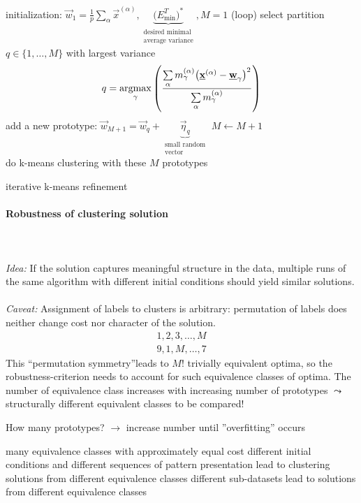 \begin{algorithm}
\DontPrintSemicolon
initialization: $\vec{w}_1 = \frac{1}{p} \sum\limits_{\alpha} 
	\vec{x}^{(\alpha)}, \underbrace{ \big( E_{\min}^T \big)^* }_{
			\substack{	\text{desired minimal} \\
					\text{average variance}} }
		, M = 1$ \;
\Begin(loop){
 \;
select partition $q \in \{ 1, \ldots, M \}$ with largest variance
\[ q = \argmax_{\gamma} \left( \frac{\sum\limits_{\alpha} m_\gamma^{(\alpha)}
  \big( \vec{x}^{(\alpha)} - \vec{w}_\gamma \big)^2}{\sum\limits_{\alpha}
  m_\gamma^{(\alpha)}} \right) \]
add a new prototype:  $\vec{w}_{M+1} = \vec{w}_q + 
\underbrace{ \vec{\eta}_q }_{ \substack{	\text{small random} \\
    \text{vector}} }$\;
$M \leftarrow M + 1$\\
do k-means clustering with these $M$ prototypes \\
}
\label{alg:iterative-k-means-refinement}
\caption{iterative k-means refinement}
\end{algorithm}

\paragraph{Robustness of clustering solution}\mbox{}\\\\
\emph{Idea:} If the solution captures meaningful structure in the
data, multiple runs of the same algorithm with different initial
conditions should yield similar solutions.
\\\\
\emph{Caveat:} Assignment of labels to clusters is arbitrary: permutation of labels does
neither change cost nor character of the solution. 
\[ \begin{array}{l}
	1, 2, 3, \ldots, M \\
	9, 1, M, \ldots, 7
      \end{array} 
\]
This ``permutation symmetry''leads to $M!$ trivially equivalent optima, so the robustness-criterion needs to account for such equivalence classes of optima.  
The number of equivalence class increases with increasing number of prototypes
$\leadsto$ structurally different equivalent classes to be compared!


How many prototypes? $\rightarrow$ increase number until
''overfitting'' occurs
\begin{itemize}
  \itl many equivalence classes with approximately equal cost
  \itl different initial conditions and different sequences of pattern 
  presentation lead to clustering solutions from different 
  equivalence classes
  \itl different sub-datasets lead to solutions from different 
  equivalence classes
\end{itemize} 

